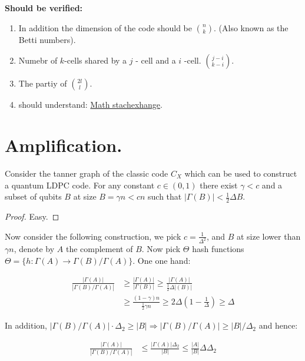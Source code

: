 \documentclass[manuscript,screen,review]{acmart}
\begin{document}
\textbf{Should be verified:}
\begin{enumerate}
  \item In addition the dimension of the code should be ${ n \choose k } $. (Also known as the Betti numbers). 
  \item Numebr of $k$-cells shared by a $j$ - cell and a $i$ -cell. $  { j - i \choose  k- i }  $. 
  \item The partiy of ${ 2l \choose l }  $.  
  \item should understand: \href{https://math.stackexchange.com/questions/3242404/homology-of-n-dimensional-torus}{Math stachexhange}.
\end{enumerate}



\section{Amplification.} 


\begin{claim}
  Consider the tanner graph of the classic code $C_X$ which can be used to construct a quantum LDPC code. For any constant $c \in (0,1)$ there exist $\gamma < c$  and a subset of qubits $B$ at size  $B = \gamma n < c n$ such that $|\Gamma(B)| < \frac{1}{2} \Delta B$. 
\end{claim}
\begin{proof}
  Easy. 
\end{proof}

Now consider the following construction, we pick $c = \frac{1}{\Delta^{2}}$, and $B$ at size lower than $\gamma n$, denote by $A$ the complement of $B$. Now pick $\Theta$ hash functions $ \Theta = \{ h : \Gamma(A) \rightarrow \Gamma (B) / \Gamma (A) \}$. 
One one hand: 


\begin{equation*}
  \begin{split}
    \frac{|\Gamma(A)|}{ |\Gamma(B)/\Gamma(A)| } & \ge  \frac{|\Gamma(A)|}{ |\Gamma(B)| } \ge    \frac{|\Gamma(A)|}{ \frac{1}{2}\Delta|(B)|}\\
  & \ge \frac{\left( 1 - \gamma \right) n}{  \frac{1}{2} \gamma n  } \ge 2\Delta ( 1 - \frac{1}{\Delta} ) \ge \Delta
  \end{split}
\end{equation*}

In addition, $| \Gamma(B) / \Gamma(A) | \cdot \Delta_{2} \ge |B| \Rightarrow | \Gamma(B) / \Gamma(A) |  \ge |B|/\Delta_{2}$ and hence:

\begin{equation*}
  \begin{split}
    \frac{|\Gamma(A)|}{ |\Gamma(B)/\Gamma(A)| } & \le     \frac{|\Gamma(A)|\Delta_{2}}{ |B| } \le \frac{|A|}{|B|} \Delta \Delta_{2}
  \end{split}
\end{equation*}
\end{document}
